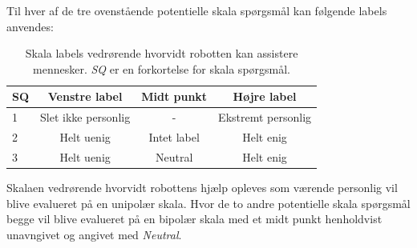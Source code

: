 \noindent
%
Til hver af de tre ovenstående potentielle skala spørgsmål kan følgende labels anvendes:
%
\begin{table}[H]
	\centering
	\begin{tabular}{l|c|c|c}
		SQ     & Venstre label & Midt punkt & Højre label \\\hline
		1   & Slet ikke personlig & - & Ekstremt personlig          \\\hline
		2   & Helt uenig & Intet label & Helt enig   \\\hline
		3   & Helt uenig & Neutral & Helt enig  
	\end{tabular}
\caption{Skala labels vedrørende hvorvidt robotten kan assistere mennesker. \textit{SQ} er en forkortelse for skala spørgsmål.}
	\label{tab:AssistererMennesker}
\end{table}
\noindent
%
Skalaen vedrørende hvorvidt robottens hjælp opleves som værende personlig vil blive evalueret på en unipolær skala. Hvor de to andre potentielle skala spørgsmål begge vil blive evalueret på en bipolær skala med et midt punkt henholdvist unavngivet og angivet med \textit{Neutral}.
\newpage
%
